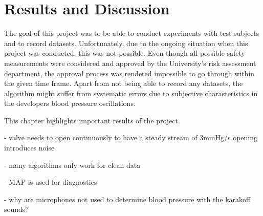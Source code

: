 \chapter{Results and Discussion}\label{cp:res}

The goal of this project was to be able to conduct experiments with test subjects and to record datasets. Unfortunately, due to the ongoing situation when this project was conducted, this was not possible. Even though all possible safety measurements were considered and approved by the University's risk assessment department, the approval process was rendered impossible to go through within the given time frame. Apart from not being able to record any datasets, the algorithm might suffer from systematic errors due to subjective charasteristics in the developers blood pressure oscillations. 


This chapter highlights important results of the project.


- valve needs to open continuously to have a steady stream of 3mmHg/s
  opening introduces noise

- many algorithms only work for clean data

- MAP is used for diagnostics 

- why are microphones not used to determine blood pressure with the karakoff sounds?


